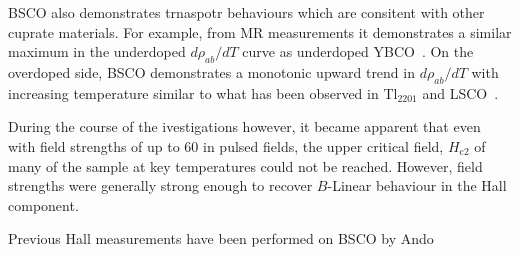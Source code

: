 \ac{BSCO} also demonstrates trnaspotr behaviours which are consitent with other \highTc cuprate materials. For example, from \ac{MR} measurements it demonstrates a similar maximum in the underdoped $d\rho_{ab}/dT$ curve as underdoped YBCO~\cite{Ando1999}. On the overdoped side, \ac{BSCO} demonstrates a monotonic upward trend in $d\rho_{ab}/dT$ with increasing temperature similar to what has been observed in Tl$_{2201}$ and \ac{LSCO}~\cite{Ando1999}.

During the course of the ivestigations however, it became apparent that even with field strengths of up to \unit{60}{\tesla} in pulsed fields, the upper critical field, $H_{\textrm{c2}}$ of many of the sample at key temperatures could not be reached. However, field strengths were generally strong enough to recover $B$-Linear behaviour in the Hall component.

Previous Hall measurements have been performed on \ac{BSCO} by Ando \etal {}





